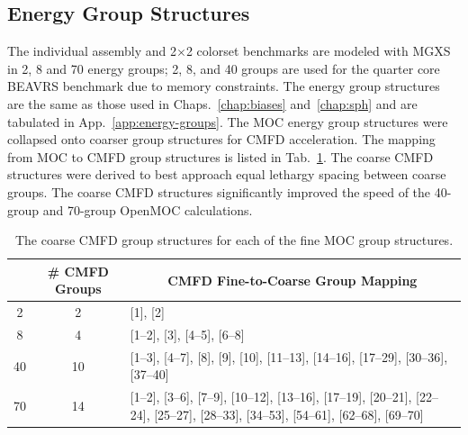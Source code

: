 \subsection{Energy Group Structures}
\label{subsec:chap8-energy-groups}

The individual assembly and 2$\times$2 colorset benchmarks are modeled with \ac{MGXS} in 2, 8 and 70 energy groups; 2, 8, and 40 groups are used for the quarter core \ac{BEAVRS} benchmark due to memory constraints. The energy group structures are the same as those used in Chaps.~\ref{chap:biases} and~\ref{chap:sph} and are tabulated in App.~\ref{app:energy-groups}. The \ac{MOC} energy group structures were collapsed onto coarser group structures for \ac{CMFD} acceleration. The mapping from \ac{MOC} to \ac{CMFD} group structures is listed in Tab.~\ref{table:chap8-coarse-cmfd-groups}. The coarse \ac{CMFD} structures were derived to best approach equal lethargy spacing between coarse groups. The coarse \ac{CMFD} structures significantly improved the speed of the 40-group and 70-group OpenMOC calculations.

\begin{table}[h!]
  \centering
  \caption[Coarse \ac{CMFD} group structures]{The coarse \ac{CMFD} group structures for each of the fine \ac{MOC} group structures.}
  \small
  \label{table:chap8-coarse-cmfd-groups}
  \vspace{6pt}
  \begin{tabular}{p{1.5cm} p{1.5cm} p{7.2cm}}
  \toprule
  \rowcolor{lightgray}
  \multicolumn{1}{c}{\cellcolor{lightgray} \textbf{\# \ac{MOC} Groups}} &
  \multicolumn{1}{c}{\cellcolor{lightgray} \textbf{\# \ac{CMFD} Groups}} &
  \multicolumn{1}{c}{\cellcolor{lightgray} \textbf{\ac{CMFD} Fine-to-Coarse Group Mapping}} \\
  \midrule
  \multicolumn{1}{c}{2} & \multicolumn{1}{c}{2} & [1], [2] \\
  \midrule
  \multicolumn{1}{c}{8} & \multicolumn{1}{c}{4} & [1--2], [3], [4--5], [6--8] \\
  \midrule
  \multicolumn{1}{c}{40} & \multicolumn{1}{c}{10} & [1--3], [4--7], [8], [9], [10], [11--13], \hspace{0.8cm} [14--16], [17--29], [30--36], [37--40] \\
  \midrule
  \multicolumn{1}{c}{70} & \multicolumn{1}{c}{14} & [1--2], [3--6], [7--9], [10--12], [13--16], \hspace{0.6cm} [17--19], [20--21], [22--24], [25--27], [28--33], [34--53], [54--61], [62--68], [69--70] \\ 
  \bottomrule
\end{tabular}
\end{table}

